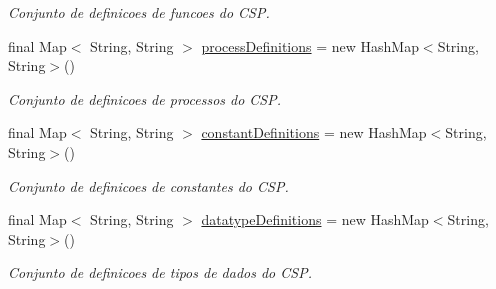 \begin{DoxyCompactItemize}
\begin{DoxyCompactList}\small\item\em Conjunto de definicoes de funcoes do C\+SP. \end{DoxyCompactList}\item 
\mbox{\label{classcom_1_1fware_1_1cspdt_1_1cspm_1_1core_1_1model_1_1_csp_m_model_aed9a230ed281bd58e6d28a542bb5f01a}} 
final Map$<$ String, String $>$ \hyperlink{classcom_1_1fware_1_1cspdt_1_1cspm_1_1core_1_1model_1_1_csp_m_model_aed9a230ed281bd58e6d28a542bb5f01a}{process\+Definitions} = new Hash\+Map$<$String, String$>$()
\begin{DoxyCompactList}\small\item\em Conjunto de definicoes de processos do C\+SP. \end{DoxyCompactList}\item 
\mbox{\label{classcom_1_1fware_1_1cspdt_1_1cspm_1_1core_1_1model_1_1_csp_m_model_ab6b6af2200f818acba683e14e6014957}} 
final Map$<$ String, String $>$ \hyperlink{classcom_1_1fware_1_1cspdt_1_1cspm_1_1core_1_1model_1_1_csp_m_model_ab6b6af2200f818acba683e14e6014957}{constant\+Definitions} = new Hash\+Map$<$String, String$>$()
\begin{DoxyCompactList}\small\item\em Conjunto de definicoes de constantes do C\+SP. \end{DoxyCompactList}\item 
\mbox{\label{classcom_1_1fware_1_1cspdt_1_1cspm_1_1core_1_1model_1_1_csp_m_model_a925ce7d39dc1949824c100cd019fa3e9}} 
final Map$<$ String, String $>$ \hyperlink{classcom_1_1fware_1_1cspdt_1_1cspm_1_1core_1_1model_1_1_csp_m_model_a925ce7d39dc1949824c100cd019fa3e9}{datatype\+Definitions} = new Hash\+Map$<$String, String$>$()
\begin{DoxyCompactList}\small\item\em Conjunto de definicoes de tipos de dados do C\+SP. \end{DoxyCompactList}\item 
\mbox{\label{classcom_1_1fware_1_1cspdt_1_1cspm_1_1core_1_1model_1_1_csp_m_model_a635d031bc7fefc435cc03539814a1fd2}} 

\end{DoxyCompactItemize}
